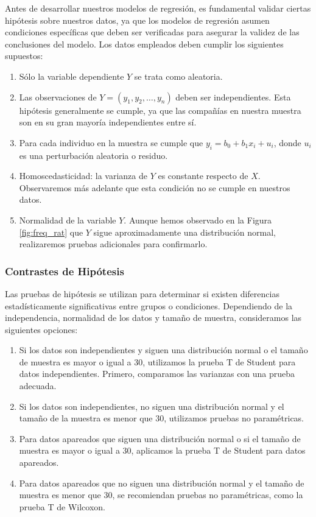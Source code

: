 \documentclass{article}
\begin{document}
Antes de desarrollar nuestros modelos de regresión, es fundamental validar ciertas hipótesis sobre nuestros datos, ya que los modelos de regresión asumen condiciones específicas que deben ser verificadas para asegurar la validez de las conclusiones del modelo. Los datos empleados deben cumplir los siguientes supuestos:

\begin{enumerate}
    \item Sólo la variable dependiente \(Y\) se trata como aleatoria.
    \item Las observaciones de \(Y=(y_1, y_2, \ldots, y_n)\) deben ser independientes. Esta hipótesis generalmente se cumple, ya que las compañías en nuestra muestra son en su gran mayoría independientes entre sí.
    \item Para cada individuo en la muestra se cumple que \(y_i = b_0 + b_1 x_i + u_i\), donde \(u_i\) es una perturbación aleatoria o residuo.
    \item Homoscedasticidad: la varianza de \(Y\) es constante respecto de \(X\). Observaremos más adelante que esta condición no se cumple en nuestros datos.
    \item Normalidad de la variable \(Y\). Aunque hemos observado en la Figura \ref{fig:freq_rat} que \(Y\) sigue aproximadamente una distribución normal, realizaremos pruebas adicionales para confirmarlo.
\end{enumerate}

\subsubsection{Contrastes de Hipótesis}
Las pruebas de hipótesis se utilizan para determinar si existen diferencias estadísticamente significativas entre grupos o condiciones. Dependiendo de la independencia, normalidad de los datos y tamaño de muestra, consideramos las siguientes opciones:

\begin{enumerate}
    \item Si los datos son independientes y siguen una distribución normal o el tamaño de muestra es mayor o igual a 30, utilizamos la prueba T de Student para datos independientes. Primero, comparamos las varianzas con una prueba adecuada.
    \item Si los datos son independientes, no siguen una distribución normal y el tamaño de la muestra es menor que 30, utilizamos pruebas no paramétricas.
    \item Para datos apareados que siguen una distribución normal o si el tamaño de muestra es mayor o igual a 30, aplicamos la prueba T de Student para datos apareados.
    \item Para datos apareados que no siguen una distribución normal y el tamaño de muestra es menor que 30, se recomiendan pruebas no paramétricas, como la prueba T de Wilcoxon.
\end{enumerate}
\end{document}
